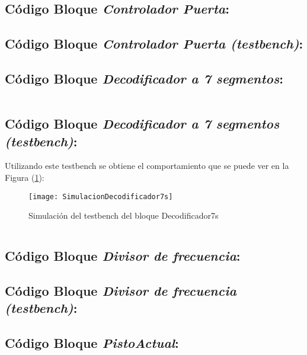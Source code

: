 \subsection{Código Bloque \textit{Controlador Puerta}:} \label{code:ControladorPuerta}

\subsection{Código Bloque \textit{Controlador Puerta (testbench)}:} \label{code:ControladorPuerta_tb}

\subsection{Código Bloque \textit{Decodificador a 7 segmentos}:} \label{code:Decodificador7s}
	\inputminted[frame=lines,fontsize=\footnotesize,linenos]{vhdl}{CodeFiles/Decodificador7s.vhd}

\subsection{Código Bloque \textit{Decodificador a 7 segmentos (testbench)}:} \label{code:Decodificador7s_tb}
	Utilizando este testbench se obtiene el comportamiento que se puede ver en la Figura (\ref{fig:SimulacionDecodificador7s}):

    \begin{figure}[H]
		    \centering
		    \texttt{[image: SimulacionDecodificador7s]}
		    \caption{Simulación del testbench del bloque Decodificador7s}
		    \label{fig:SimulacionDecodificador7s}
	\end{figure}
	\inputminted[frame=lines,fontsize=\footnotesize,linenos]{vhdl}{CodeFiles/Decodificador7s_tb.vhd}

\subsection{Código Bloque \textit{Divisor de frecuencia}:} \label{code:DivisorFrecuencia}

\subsection{Código Bloque \textit{Divisor de frecuencia (testbench)}:} \label{code:DivisorFrecuencia_Tb}

\subsection{Código Bloque \textit{PistoActual}:} \label{code:PisoActual}
    \inputminted[frame=lines,fontsize=\footnotesize,linenos]{vhdl}{CodeFiles/PisoActual.vhd}
    
